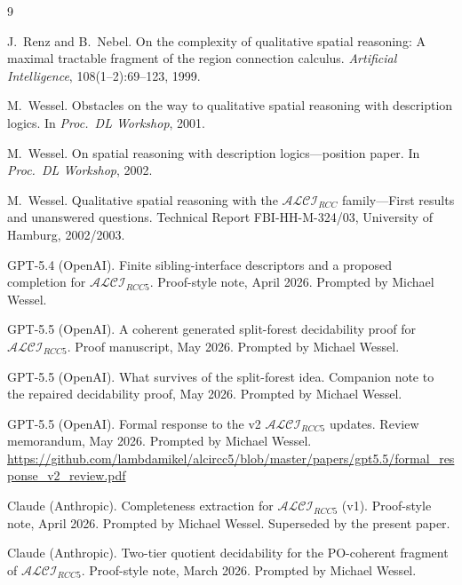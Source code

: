 \documentclass[11pt]{article}
\theoremstyle{definition}
\theoremstyle{remark}
\begin{document}
\begin{thebibliography}{9}

J.~Renz and B.~Nebel.
\newblock On the complexity of qualitative spatial reasoning: A maximal
  tractable fragment of the region connection calculus.
\newblock \emph{Artificial Intelligence}, 108(1--2):69--123, 1999.

M.~Wessel.
\newblock Obstacles on the way to qualitative spatial reasoning with
  description logics.
\newblock In \emph{Proc.\ DL Workshop}, 2001.

M.~Wessel.
\newblock On spatial reasoning with description logics---position paper.
\newblock In \emph{Proc.\ DL Workshop}, 2002.

M.~Wessel.
\newblock Qualitative spatial reasoning with the
  {$\mathcal{ALCI}_\mathit{RCC}$} family---{F}irst results and
  unanswered questions.
\newblock Technical Report FBI-HH-M-324/03, University of Hamburg, 2002/2003.

GPT-5.4 (OpenAI).
\newblock Finite sibling-interface descriptors and a proposed completion
  for $\mathcal{ALCI}_{RCC5}$.
\newblock Proof-style note, April 2026.
\newblock Prompted by Michael Wessel.

GPT-5.5 (OpenAI).
\newblock A coherent generated split-forest decidability proof for
  $\mathcal{ALCI}_{RCC5}$.
\newblock Proof manuscript, May 2026.
\newblock Prompted by Michael Wessel.

GPT-5.5 (OpenAI).
\newblock What survives of the split-forest idea.
\newblock Companion note to the repaired decidability proof,
  May 2026.
\newblock Prompted by Michael Wessel.

GPT-5.5 (OpenAI).
\newblock Formal response to the v2 $\mathcal{ALCI}_{RCC5}$ updates.
\newblock Review memorandum, May 2026.
\newblock Prompted by Michael Wessel.
\newblock \url{https://github.com/lambdamikel/alcircc5/blob/master/papers/gpt5.5/formal_response_v2_review.pdf}

Claude (Anthropic).
\newblock Completeness extraction for $\mathcal{ALCI}_{RCC5}$ (v1).
\newblock Proof-style note, April 2026.
\newblock Prompted by Michael Wessel.
\newblock Superseded by the present paper.

Claude (Anthropic).
\newblock Two-tier quotient decidability for the PO-coherent fragment
  of $\mathcal{ALCI}_{RCC5}$.
\newblock Proof-style note, March 2026.
\newblock Prompted by Michael Wessel.


\end{thebibliography}
\end{document}
